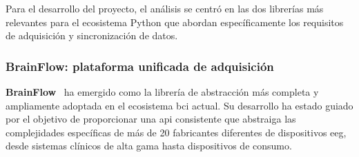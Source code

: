 \begin{table}[h!]
\centering
{}
\caption{Panorama de librerías y \textit{\glspl{framework}} para EEG por lenguaje}
\label{tab:librerias_abstraccion}
\end{table}

Para el desarrollo del proyecto, el análisis se centró en las dos librerías más relevantes para el ecosistema Python que abordan específicamente los requisitos de adquisición y sincronización de datos.

\subsubsection{BrainFlow: plataforma unificada de adquisición}
\label{subsubsec:brainflow}

\textbf{BrainFlow}~\cite{brainflow,Rakhmatulin2021} ha emergido como la librería de abstracción más completa y ampliamente adoptada en el ecosistema \acrshort{bci} actual. Su desarrollo ha estado guiado por el objetivo de proporcionar una \acrshort{api} consistente que abstraiga las complejidades específicas de más de 20 fabricantes diferentes de dispositivos \acrshort{eeg}, desde sistemas clínicos de alta gama hasta dispositivos de consumo.

